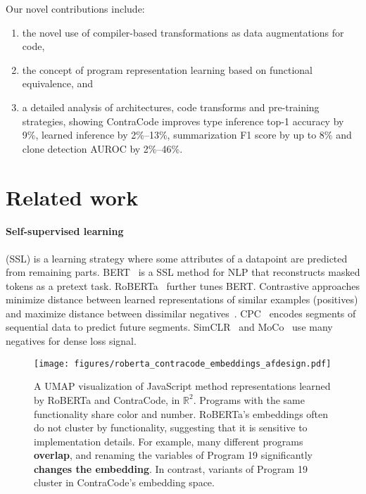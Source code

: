 \documentclass[11pt]{article}
\newcommand{\ours}[0]{ContraCode}
\begin{document}
Our novel contributions include:
\begin{enumerate}
    \item the novel use of compiler-based transformations as data augmentations for code,
    \item the concept of program representation learning based on functional equivalence, and
    \item a detailed analysis of architectures, code transforms and pre-training strategies, showing \ours{} improves type inference top-1 accuracy by 9\%, learned inference by 2\%--13\%, summarization F1 score by up to 8\% and clone detection AUROC by 2\%--46\%.
\end{enumerate}

\section{Related work}
\paragraph{Self-supervised learning} (SSL) is a learning strategy where some attributes of a datapoint are predicted from remaining parts.
BERT~\cite{devlin2018bert} is a SSL method for NLP that reconstructs masked tokens as a pretext task. RoBERTa~\cite{liu2019roberta} further tunes BERT. Contrastive approaches minimize distance between learned representations of similar examples (positives) and maximize distance between dissimilar negatives~\citep{hadsell2006dimensionality}.
CPC~\citep{cpcv1_oord2018representation, henaff2019data} encodes segments of sequential data to predict future segments. SimCLR~\citep{chen2020simple} and MoCo~\citep{he2019momentum, chen2020improved} use many negatives for dense loss signal.

\begin{figure}[t]
    \centering
    \texttt{[image: figures/roberta\_contracode\_embeddings\_afdesign.pdf]}
    \caption{A UMAP visualization of JavaScript method representations learned by RoBERTa and \ours{}, in $\mathbb{R}^2$. Programs with the same functionality share color and number. RoBERTa's embeddings often do not cluster by functionality, suggesting that it is sensitive to implementation details. For example, many different programs {\color[HTML]{7030A0}\textbf{overlap}}, and renaming the variables of Program 19 significantly {\color[HTML]{C00000}\textbf{changes the embedding}}. In contrast, variants of Program 19 cluster in \ours{}'s embedding space.}
    \label{fig:bert_motivation_tsne}
\end{figure}
\end{document}
